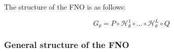 
The structure of the FNO is as follows:

\begin{equation*}
	G_\theta = P \circ \mathcal{H}_\theta^1 \circ \dots \circ \mathcal{H}_\theta^L \circ Q
\end{equation*}

\subsubsection{General structure of the FNO} \label{FNO.general}


